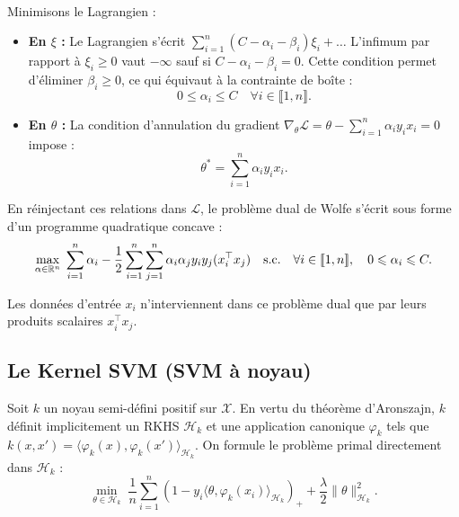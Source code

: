 \paragraph{}
\begin{proposition}
    Minimisons le Lagrangien : 
    \begin{itemize}
        \item \textbf{En $\xi$ :} Le Lagrangien s'écrit $\sum_{i=1}^n (C - \alpha_i - \beta_i)\xi_i + \dots$ L'infimum par rapport à $\xi_i \geqslant 0$ vaut $-\infty$ sauf si $C - \alpha_i - \beta_i = 0$. Cette condition permet d'éliminer $\beta_i \geqslant 0$, ce qui équivaut à la contrainte de boîte :
        \begin{equation}
            0 \leqslant \alpha_i \leqslant C \quad \forall i \in \llbracket 1, n \rrbracket.
        \end{equation}
        \item \textbf{En $\theta$ :} La condition d'annulation du gradient $\nabla_\theta \mathcal{L} = \theta - \sum_{i=1}^n \alpha_i y_i x_i = 0$ impose :
        \begin{equation}
            \theta^* = \sum_{i=1}^n \alpha_i y_i x_i.
        \end{equation}
    \end{itemize}
\end{proposition}

En réinjectant ces relations dans $\mathcal{L}$, le problème dual de Wolfe s'écrit sous forme d'un programme quadratique concave :
\begin{equation}
    \max_{\alpha \in \mathbb{R}^n} \; \sum_{i=1}^n \alpha_i - \frac{1}{2} \sum_{i=1}^n \sum_{j=1}^n \alpha_i \alpha_j y_i y_j (x_i^\top x_j) \quad \text{s.c.} \quad \forall i \in \llbracket 1, n \rrbracket, \quad 0 \leqslant \alpha_i \leqslant C.
\end{equation}

\begin{remark}
    Les données d'entrée $x_i$ n'interviennent dans ce problème dual que par leurs produits scalaires $x_i^\top x_j$.
\end{remark}

\subsection{Le Kernel SVM (SVM à noyau)}

Soit $k$ un noyau semi-défini positif sur $\mathcal{X}$. En vertu du théorème d'Aronszajn, $k$ définit implicitement un RKHS $\mathcal{H}_k$ et une application canonique $\varphi_k$ tels que $k(x, x') = \langle \varphi_k(x), \varphi_k(x') \rangle_{\mathcal{H}_k}$. 
On formule le problème primal directement dans $\mathcal{H}_k$ :
\begin{equation}
    \min_{\theta \in \mathcal{H}_k} \; \frac{1}{n} \sum_{i=1}^n \left(1 - y_i \langle \theta, \varphi_k(x_i) \rangle_{\mathcal{H}_k}\right)_+ + \frac{\lambda}{2} \|\theta\|_{\mathcal{H}_k}^2.
\end{equation}

